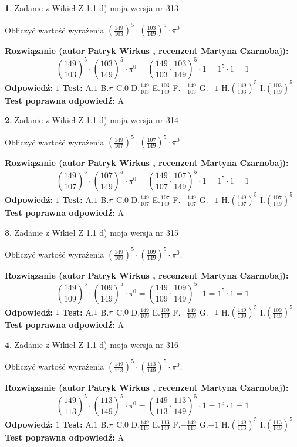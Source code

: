 \documentclass[12pt, a4paper]{article}
\theoremstyle{definition} %
\newtheorem{zad}{}
\newcommand{\zadStart}[1]{\begin{zad}#1\newline}
\newcommand{\zadStop}{\end{zad}}
\newcommand{\rozwStart}[2]{\noindent \textbf{Rozwiązanie (autor #1 , recenzent #2): }\newline}
\newcommand{\rozwStop}{\newline}
\newcommand{\odpStart}{\noindent \textbf{Odpowiedź:}\newline}
\newcommand{\odpStop}{\newline}
\newcommand{\testStart}{\noindent \textbf{Test:}\newline}
\newcommand{\testStop}{\newline}
\newcommand{\kluczStart}{\noindent \textbf{Test poprawna odpowiedź:}\newline}
\newcommand{\kluczStop}{\newline}
\begin{document}
\zadStart{Zadanie z Wikieł Z 1.1 d) moja wersja nr 313}

Obliczyć wartość wyrażenia $(\frac{149}{103})^{5} \cdot (\frac{103}{149})^{5} \cdot \pi^{0}$.
\zadStop
\rozwStart{Patryk Wirkus}{Martyna Czarnobaj}
$$(\frac{149}{103})^{5} \cdot (\frac{103}{149})^{5} \cdot \pi^{0} = (\frac{149}{103} \cdot \frac{103}{149})^{5} \cdot 1 = 1^{5} \cdot 1 = 1$$
\rozwStop
\odpStart
$1$
\odpStop
\testStart
A.$1$ B.$\pi$ C.$0$ D.$\frac{149}{103}$ E.$\frac{103}{149}$
F.$-\frac{149}{103}$ G.$-1$
H.$(\frac{149}{103})^{5}$
I.$(\frac{103}{149})^{5}$
\testStop
\kluczStart
A
\kluczStop



\zadStart{Zadanie z Wikieł Z 1.1 d) moja wersja nr 314}

Obliczyć wartość wyrażenia $(\frac{149}{107})^{5} \cdot (\frac{107}{149})^{5} \cdot \pi^{0}$.
\zadStop
\rozwStart{Patryk Wirkus}{Martyna Czarnobaj}
$$(\frac{149}{107})^{5} \cdot (\frac{107}{149})^{5} \cdot \pi^{0} = (\frac{149}{107} \cdot \frac{107}{149})^{5} \cdot 1 = 1^{5} \cdot 1 = 1$$
\rozwStop
\odpStart
$1$
\odpStop
\testStart
A.$1$ B.$\pi$ C.$0$ D.$\frac{149}{107}$ E.$\frac{107}{149}$
F.$-\frac{149}{107}$ G.$-1$
H.$(\frac{149}{107})^{5}$
I.$(\frac{107}{149})^{5}$
\testStop
\kluczStart
A
\kluczStop



\zadStart{Zadanie z Wikieł Z 1.1 d) moja wersja nr 315}

Obliczyć wartość wyrażenia $(\frac{149}{109})^{5} \cdot (\frac{109}{149})^{5} \cdot \pi^{0}$.
\zadStop
\rozwStart{Patryk Wirkus}{Martyna Czarnobaj}
$$(\frac{149}{109})^{5} \cdot (\frac{109}{149})^{5} \cdot \pi^{0} = (\frac{149}{109} \cdot \frac{109}{149})^{5} \cdot 1 = 1^{5} \cdot 1 = 1$$
\rozwStop
\odpStart
$1$
\odpStop
\testStart
A.$1$ B.$\pi$ C.$0$ D.$\frac{149}{109}$ E.$\frac{109}{149}$
F.$-\frac{149}{109}$ G.$-1$
H.$(\frac{149}{109})^{5}$
I.$(\frac{109}{149})^{5}$
\testStop
\kluczStart
A
\kluczStop



\zadStart{Zadanie z Wikieł Z 1.1 d) moja wersja nr 316}

Obliczyć wartość wyrażenia $(\frac{149}{113})^{5} \cdot (\frac{113}{149})^{5} \cdot \pi^{0}$.
\zadStop
\rozwStart{Patryk Wirkus}{Martyna Czarnobaj}
$$(\frac{149}{113})^{5} \cdot (\frac{113}{149})^{5} \cdot \pi^{0} = (\frac{149}{113} \cdot \frac{113}{149})^{5} \cdot 1 = 1^{5} \cdot 1 = 1$$
\rozwStop
\odpStart
$1$
\odpStop
\testStart
A.$1$ B.$\pi$ C.$0$ D.$\frac{149}{113}$ E.$\frac{113}{149}$
F.$-\frac{149}{113}$ G.$-1$
H.$(\frac{149}{113})^{5}$
I.$(\frac{113}{149})^{5}$
\testStop
\kluczStart
A
\kluczStop
\end{document}
